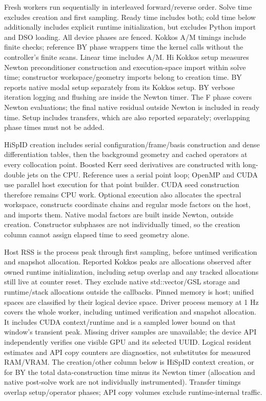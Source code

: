 \documentclass[11pt]{article}
\begin{document}
Fresh workers run sequentially in interleaved forward/reverse order.
Solve time excludes creation and first sampling. Ready time includes both;
cold time below additionally includes explicit runtime initialization, but
excludes Python import and DSO loading. All device phases are fenced.
Kokkos A/M timings include finite checks; reference BY phase wrappers time
the kernel calls without the controller's finite scans. Linear time includes
A/M. Hi Kokkos setup measures Newton preconditioner construction and
execution-space import within solve time; constructor workspace/geometry
imports belong to creation time. BY reports native
modal setup separately from its Kokkos setup. BY verbose iteration
logging and flushing are inside the Newton timer. The F phase covers Newton
evaluations; the final native residual outside Newton is included in ready
time. Setup includes transfers,
which are also reported separately; overlapping phase times must not be added.

HiSpID creation includes serial configuration/frame/basis construction and
dense differentiation tables, then the background geometry and cached
operators at every collocation point. Boosted Kerr seed derivatives are
constructed with long-double jets on the CPU. Reference uses a serial point
loop; OpenMP and CUDA use parallel host execution for that point builder.
CUDA seed construction therefore remains CPU work. Optional execution also
allocates the spectral workspace, constructs coordinate chains and regular
mode factors on the host, and imports them. Native modal factors are built
inside Newton, outside creation. Constructor subphases are not individually
timed, so the creation column cannot assign elapsed time to seed geometry
alone.

Host RSS is the process peak through first sampling, before untimed verification
and snapshot allocation. Reported Kokkos peaks are allocations observed after
owned runtime initialization, including setup overlap and any tracked allocations
still live at counter reset. They exclude native std::vector/GSL storage and
runtime/stack allocations outside the callbacks. Pinned memory
is host; unified spaces are classified by their logical device space. Driver
process memory at 1 Hz covers the whole worker, including untimed verification
and snapshot allocation. It includes CUDA context/runtime and is a sampled lower
bound on that window's transient peak. Missing driver samples are unavailable;
the device API independently verifies one visible GPU and its selected UUID.
Logical resident estimates and API copy counters
are diagnostics, not substitutes for measured RAM/VRAM.
The creation/other column below is HiSpID context creation, or for BY the
total data-construction time minus its Newton timer (allocation and native
post-solve work are not individually instrumented). Transfer timings overlap
setup/operator phases; API copy volumes exclude runtime-internal traffic.
\end{document}
